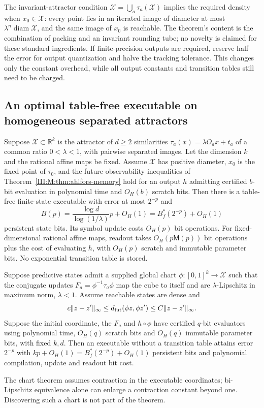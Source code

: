 The invariant-attractor condition
$\mathcal X=\bigcup_a\tau_a(\mathcal X)$ implies the required density
when $x_0\in\mathcal X$: every point lies in an iterated image of
diameter at most $\lambda^n\operatorname{diam}\mathcal X$, and the
same image of $x_0$ is reachable. The theorem's content is the
combination of packing and an invariant rounding tube; no novelty is
claimed for these standard ingredients. If finite-precision outputs are
required, reserve half the error for output quantization and halve the
tracking tolerance. This changes only the constant overhead, while all
output constants and transition tables still need to be charged.


\subsection{An optimal table-free executable on homogeneous separated attractors}
\label{III:M:sec:address-memory}
\begin{theorem}
\label{III:M:thm:address-memory}
Suppose $\mathcal X\subset\mathbb R^k$ is the attractor of $d\ge2$
similarities $\tau_a(x)=\lambda O_ax+t_a$ of a common ratio
$0<\lambda<1$, with pairwise separated images. Let the dimension
$k$ and the rational affine maps be fixed. Assume $\mathcal X$ has
positive diameter, $x_0$ is the fixed point of $\tau_0$, and the
future-observability inequalities of Theorem~\ref{III:M:thm:ahlfors-memory}
hold for an output $h$ admitting certified $b$-bit evaluation in
polynomial time and $O_H(b)$ scratch bits. Then there is a table-free
finite-state executable with error at most $2^{-p}$ and
\[
 B(p)=\frac{\log d}{\log(1/\lambda)}p+O_H(1)
       =B_f^*(2^{-p})+O_H(1)
\]
persistent state bits. Its symbol update costs $O_H(p)$ bit operations.
For fixed-dimensional rational affine maps, readout takes
$O_H(p\mathsf M(p))$ bit operations plus the cost of evaluating $h$,
with $O_H(p)$ scratch and immutable parameter bits. No exponential
transition table is stored.
\end{theorem}

\begin{theorem}
\label{III:M:thm:chart-memory}
Suppose predictive states admit a supplied global chart
$\phi:[0,1]^k\to\mathcal X$ such that the conjugate updates
$F_a=\phi^{-1}\tau_a\phi$ map the cube to itself and are
$\lambda$-Lipschitz in maximum norm, $\lambda<1$.
Assume reachable states are dense and
\[
 c\|z-z'\|_\infty\le d_{\rm fut}(\phi z,\phi z')
                         \le C\|z-z'\|_\infty.
\]
Suppose the initial coordinate, the $F_a$ and $h\circ\phi$ have
certified $q$-bit evaluators using polynomial time, $O_H(q)$ scratch
bits and $O_H(q)$ immutable parameter bits, with fixed $k,d$.
Then an executable without a transition table attains error $2^{-p}$
with $kp+O_H(1)=B_f^*(2^{-p})+O_H(1)$ persistent bits and polynomial
compilation, update and readout bit cost.
\end{theorem}

The chart theorem assumes contraction in the executable coordinates;
bi-Lipschitz equivalence alone can enlarge a contraction constant
beyond one. Discovering such a chart is not part of the theorem.

